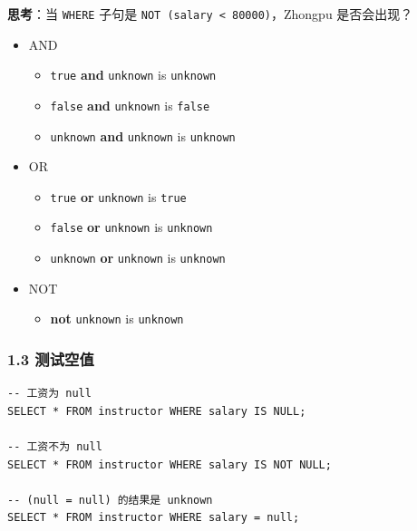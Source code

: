 \documentclass[aspectratio=169, 14pt]{beamer}
\begin{document}
\begin{frame}

    {\large {}} \textbf{思考}：当 \texttt{WHERE} 子句是 \texttt{NOT (salary < 80000)}，Zhongpu 是否会出现？
\pause    
\begin{itemize}
    \item \alert{AND}
    \begin{itemize}
        \item \texttt{true} \textbf{and} \texttt{unknown} is \texttt{unknown} 
        \item \texttt{false} \textbf{and} \texttt{unknown} is \texttt{false}
        \item \texttt{unknown} \textbf{and} \texttt{unknown} is \texttt{unknown}
    \end{itemize}
    \item \alert{OR}
    \begin{itemize}
        \item \texttt{true} \textbf{or} \texttt{unknown} is \texttt{true}  
        \item \texttt{false} \textbf{or} \texttt{unknown} is \texttt{unknown}
        \item \texttt{unknown} \textbf{or} \texttt{unknown} is \texttt{unknown} 
    \end{itemize}
    \item \alert{NOT}
    \begin{itemize}
        \item \textbf{not} \texttt{unknown} is \texttt{unknown}
    \end{itemize}
\end{itemize}
\end{frame}

\begin{frame}[fragile]
    \frametitle{1.3 测试空值}

    \begin{verbatim}
-- 工资为 null
SELECT * FROM instructor WHERE salary IS NULL;

-- 工资不为 null
SELECT * FROM instructor WHERE salary IS NOT NULL;

-- (null = null) 的结果是 unknown
SELECT * FROM instructor WHERE salary = null;
    \end{verbatim} 

\end{frame}
\end{document}
